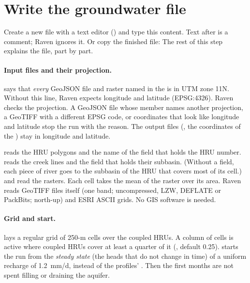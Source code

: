 \section{Write the groundwater file}

\label{st:rvg}
Create a new file  with a text editor () and type this content. Text after \cmd{\#} is
a comment; Raven ignores it.
Or copy the finished file:  The rest of this step explains the file, part by
part.

\paragraph{Input files and their projection.}
 says that \emph{every} GeoJSON file and raster named in the  is in UTM zone 11N.
Without this line, Raven expects longitude and latitude (EPSG:4326). Raven checks the projection. A GeoJSON file whose
 member names another projection, a GeoTIFF with a different EPSG code, or coordinates that look like longitude
and latitude stop the run with the reason. The output files (, the coordinates of the )
stay in longitude and latitude.

 reads the HRU polygons and the name of the field that holds the HRU number.  reads
the creek lines and the field that holds their subbasin. (Without a field, each piece of river goes to the subbasin of the
HRU that covers most of its cell.)  and  read the rasters. Each cell takes the mean
of the raster over its area. Raven reads GeoTIFF files itself (one band; uncompressed, LZW, DEFLATE or PackBits; north-up)
and ESRI ASCII grids. No GIS software is needed.

\paragraph{Grid and start.}
 lays a regular grid of 250-m cells over the coupled HRUs. A column of cells is active where coupled
HRUs cover at least a quarter of it (, default 0.25). 
starts the run from the \emph{steady state} (the heads that do not change in time) of a uniform recharge of 1.2~mm/d,
instead of the profiles' . Then the first months are not spent filling or draining the aquifer.

